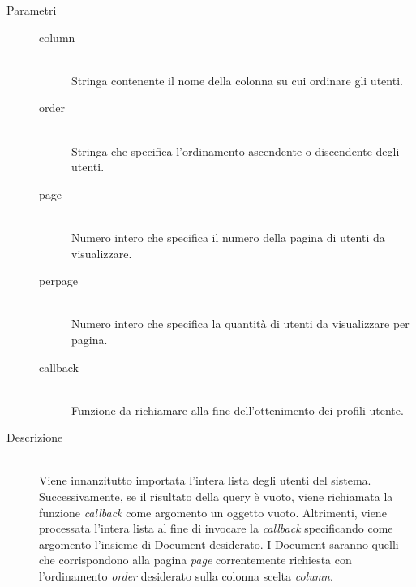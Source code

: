 \begin{description}
\begin{mldescription}
 		 \hfill
 			\begin{description}
 				\item[Parametri] \hfill
 					\begin{description}
 						\item[column] \hfill \\
 							Stringa contenente il nome della colonna su cui ordinare gli utenti.
 						\item[order] \hfill \\
 							Stringa che specifica l'ordinamento ascendente o discendente degli utenti.
 						\item[page] \hfill \\
 							Numero intero che specifica il numero della pagina di utenti da visualizzare.
 						\item[perpage] \hfill \\
 							Numero intero che specifica la quantità di utenti da visualizzare per pagina.
 						\item[callback] \hfill \\
 							Funzione da richiamare alla fine dell'ottenimento dei profili utente.
 					\end{description}
 				\item[Descrizione] \hfill \\
 				Viene innanzitutto importata l'intera lista degli utenti del sistema. Successivamente, se il risultato della query è vuoto, viene richiamata la funzione \textit{callback} come argomento un oggetto vuoto. Altrimenti, viene processata l'intera lista al fine di invocare la \textit{callback} specificando come argomento l'insieme di Document desiderato. I Document saranno quelli che corrispondono alla pagina \textit{page} correntemente richiesta con l'ordinamento \textit{order} desiderato sulla colonna scelta \textit{column}.
 			\end{description}
 			

\end{mldescription}
\end{description}
